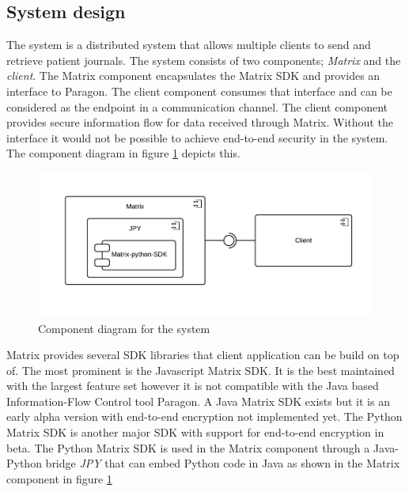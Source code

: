 

\subsection{System design} \label{systemdesign}

The system is a distributed system that allows multiple clients to send and retrieve patient journals. The system consists of two components; \emph{Matrix} and the \emph{client}. The Matrix component encapsulates the Matrix SDK and provides an interface to Paragon. The client component consumes that interface and can be considered as the endpoint in a communication channel. The client component provides secure information flow for data received through Matrix. Without the interface it would not be possible to achieve end-to-end security in the system. 
The component diagram in figure \ref{fig:matrix_component} depicts this.

\begin{figure}[H] 
	\hspace*{-1cm}
	\centering
	\includegraphics[width=14cm]{figures/matrix_component.png}
	\caption{Component diagram for the system}
	\label{fig:matrix_component}
\end{figure}

Matrix provides several SDK libraries that client application can be build on top of. The most prominent is the Javascript Matrix SDK. It is the best maintained with the largest feature set however it is not compatible with the Java based Information-Flow Control tool Paragon. A Java Matrix SDK exists but it is an early alpha version with end-to-end encryption not implemented yet. The Python Matrix SDK is another major SDK with support for end-to-end encryption in beta. The Python Matrix SDK is used in the Matrix component through a Java-Python bridge \emph{JPY} that can embed Python code in Java as shown in the Matrix component in figure \ref{fig:matrix_component} 




